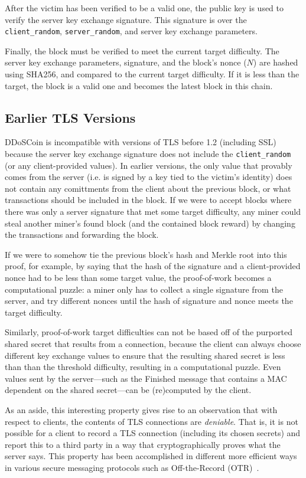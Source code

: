 After the victim has been verified to be a valid one, the public key is used to
verify the server key exchange signature. This signature is over the
\texttt{client\_random}, \texttt{server\_random}, and server key exchange
parameters.

Finally, the block must be verified to meet the current target difficulty. The
server key exchange parameters, signature, and the block's nonce ($N$) are
hashed using SHA256, and compared to the current target difficulty. If it is
less than the target, the block is a valid one and becomes the latest block in
this chain.

\subsection{Earlier TLS Versions}

DDoSCoin is incompatible with versions of TLS before 1.2 (including SSL) because
the server key exchange signature does not include the \texttt{client\_random}
(or any client-provided values). In earlier versions, the only value that
provably comes from the server (i.e.  is signed by a key tied to the victim's
identity) does not contain any comittments from the client about the previous
block, or what transactions should be included in the block. If we were to
accept blocks where there was only a server signature that met some target
difficulty, any miner could steal another miner's found block (and the contained
block reward) by changing the transactions and forwarding the block.

If we were to somehow tie the previous block's hash and Merkle root into this
proof, for example, by saying that the hash of the signature and a
client-provided nonce had to be less than some target value, the proof-of-work becomes
a computational puzzle: a miner only has to collect a single signature from
the server, and try different nonces until the hash of signature and nonce meets
the target difficulty.

Similarly, proof-of-work target difficulties can not be based off of the
purported shared secret that results from a connection, because the client can
always choose different key exchange values to ensure that the resulting shared
secret is less than than the threshold difficulty, resulting in a computational
puzzle. Even values sent by the server---such as the Finished message that
contains a MAC dependent on the shared secret---can be (re)computed by the client.

As an aside, this interesting property gives rise to an observation that with respect to
clients, the contents of TLS connections are \emph{deniable}. That is, it is not
possible for a client to record a TLS connection (including its chosen secrets)
and report this to a third party in a way that cryptographically proves what the
server says. This property has been accomplished in different more efficient ways in various
secure messaging protocols such as Off-the-Record (OTR)~\cite{otr}.

